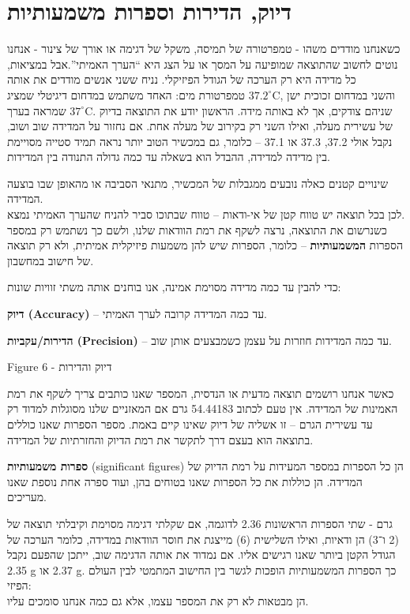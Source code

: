 \documentclass[
  hebrew,
  letterpaper,
  DIV=11,
  numbers=noendperiod]{scrreprt}
\begin{document}
\section{\texorpdfstring{{דיוק, הדירות וספרות
משמעותיות}}{דיוק, הדירות וספרות משמעותיות}}\label{ux5d3ux5d9ux5d5ux5e7-ux5d4ux5d3ux5d9ux5e8ux5d5ux5ea-ux5d5ux5e1ux5e4ux5e8ux5d5ux5ea-ux5deux5e9ux5deux5e2ux5d5ux5eaux5d9ux5d5ux5ea}

כשאנחנו מודדים משהו - טמפרטורה של תמיסה, משקל של דגימה או אורך של צינור
- אנחנו נוטים לחשוב שהתוצאה שמופיעה על המסך או על הצג היא ``הערך
האמיתי''.אבל במציאות, כל מדידה היא רק הערכה של הגודל הפיזיקלי. נניח ששני
אנשים מודדים את אותה טמפרטורת מים: האחד משתמש במדחום דיגיטלי שמציג
‎\(37.2^\circ\text{C}\)‎, והשני במדחום זכוכית ישן שמראה בערך
‎\(37^\circ\text{C}\)‎. שניהם צודקים, אך לא באותה מידה. הראשון יודע את
התוצאה בדיוק של עשירית מעלה, ואילו השני רק בקירוב של מעלה אחת. {אם נחזור
על המדידה שוב ושוב, נקבל אולי 37.2, 37.3 או 37.1 -- כלומר, גם במכשיר
הטוב יותר נראה תמיד סטייה מסויימת בין מדידה למדידה, ההבדל הוא בשאלה עד
כמה גדולה התנודה בין המדידות.}

{שינויים קטנים כאלה נובעים ממגבלות של המכשיר, מתנאי הסביבה או מהאופן שבו
בוצעה המדידה}.\\
{לכן בכל תוצאה יש טווח קטן של אי-ודאות -- טווח שבתוכו סביר להניח שהערך
האמיתי נמצא}.\\
{כשנרשום את התוצאה, נרצה לשקף את רמת הוודאות שלנו, ולשם כך נשתמש רק
במספר הספרות \textbf{המשמעותיות}} -- {כלומר, הספרות שיש להן משמעות
פיזיקלית אמיתית, ולא רק תוצאה של חישוב במחשבון}.

{כדי להבין עד כמה מדידה מסוימת אמינה, אנו בוחנים אותה משתי זוויות
שונות}:

\textbf{{דיוק} (Accuracy)} -- {עד כמה המדידה קרובה לערך האמיתי}.

\textbf{{הדירות/עקביות} (Precision)} -- {עד כמה המדידות חוזרות על עצמן
כשמבצעים אותן שוב}.

Figure {6 - דיוק והדירות}

{כאשר אנחנו רושמים תוצאה מדעית או הנדסית, המספר שאנו כותבים צריך לשקף את
רמת האמינות של המדידה}. {אין טעם לכתוב 54.44183 גרם אם המאזניים שלנו
מסוגלות למדוד רק עד עשירית הגרם -- זו אשליה של דיוק שאינו קיים באמת}.
{מספר הספרות שאנו כוללים בתוצאה הוא בעצם דרך לתקשר את רמת הדיוק
והחזרתיות של המדידה}.

{\textbf{ספרות משמעותיות} (}significant figures{) הן כל הספרות במספר
המעידות על רמת הדיוק של המדידה}. {הן כוללות את כל הספרות שאנו בטוחים
בהן}, {ועוד ספרה אחת נוספת שאנו מעריכים}.

לדוגמה, אם שקלתי דגימה מסוימת וקיבלתי תוצאה של ‎2.36‎ גרם - שתי הספרות
הראשונות (2 ו־3) הן ודאיות, ואילו השלישית (6) מייצגת את חוסר הוודאות
במדידה, כלומר הערכה של הגודל הקטן ביותר שאנו רגישים אליו. אם נמדוד את
אותה הדגימה שוב, ייתכן שהפעם נקבל ‎2.35 g‎ או ‎2.37 g‎. {כך הספרות
המשמעותיות הופכות לגשר בין החישוב המתמטי לבין העולם הפיזי}:\\
{הן מבטאות לא רק את המספר עצמו, אלא גם כמה אנחנו סומכים עליו}.
\end{document}
